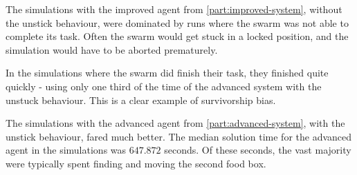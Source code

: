 \documentclass[a4paper]{article}
\begin{document}
The simulations with the improved agent from \ref{part:improved-system}, without the unstick behaviour, were dominated by runs where the swarm was not able to complete its task.
Often the swarm would get stuck in a locked position, and the simulation would have to be aborted prematurely.

In the simulations where the swarm did finish their task, they finished quite quickly - using only one third of the time of the advanced system with the unstuck behaviour.
This is a clear example of survivorship bias.

The simulations with the advanced agent from \ref{part:advanced-system}, with the unstick behaviour, fared much better.
The median solution time for the advanced agent in the simulations was $ 647.872 $ seconds.
Of these seconds, the vast majority were typically spent finding and moving the second food box.



\newpage
{}


\end{document}
